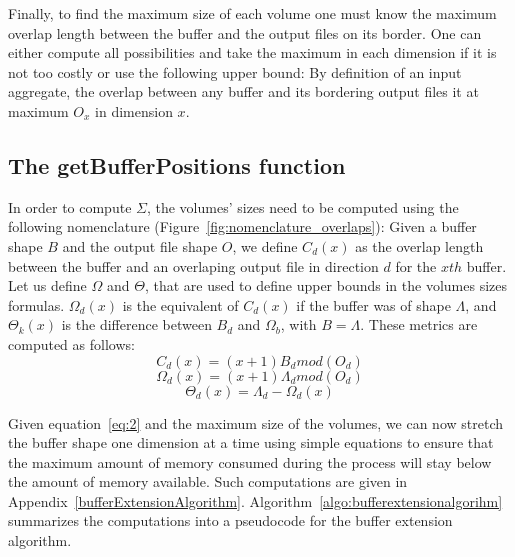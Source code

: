\documentclass[conference]{IEEEtran}
\begin{document}
Finally, to find the maximum size of each volume one must know the maximum
overlap length between the buffer and the output files on its border. One can
either compute all possibilities and take the maximum in each dimension if it is
not too costly or use the following upper bound: By definition of an input
aggregate, the overlap between any buffer and its bordering output files it at
maximum $O_x$ in dimension $x$.

\subsection{The getBufferPositions function}

In order to compute $\Sigma$, the volumes' sizes need to be computed using the
following nomenclature (Figure~\ref{fig:nomenclature_overlaps}):
Given a buffer shape $B$ and the output file shape $O$, we define $C_d(x)$ as
the overlap length between the buffer and an overlaping output file in direction
$d$ for the $x{th}$ buffer. Let us define $\Omega$ and $\Theta$, that are used
to define upper bounds in the volumes sizes formulas. $\Omega_d(x)$ is the
equivalent of $C_d(x)$ if the buffer was of shape $\Lambda$, and $\Theta_k(x)$
is the difference between $B_d$ and $\Omega_b$, with $B=\Lambda$.
These metrics are computed as follows:
$$C_d(x) = (x+1)B_d mod(O_d)$$
$$\Omega_d(x) = (x+1)\Lambda_d mod(O_d)$$
$$\Theta_d(x) = \Lambda_d - \Omega_d(x)$$

Given equation~\ref{eq:2} and the maximum size of the volumes, we can now
stretch the buffer shape one dimension at a time using simple equations to ensure
that the maximum amount of memory consumed during the process will stay below the
amount of memory available. Such computations are given in
Appendix~\ref{bufferExtensionAlgorithm}.
Algorithm~\ref{algo:bufferextensionalgorihm} summarizes the computations into a
pseudocode for the buffer extension algorithm.
\end{document}
